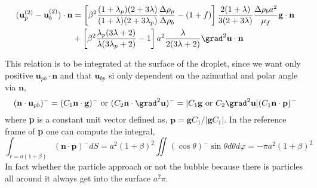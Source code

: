 \begin{align}
    (\textbf{u}_p^{(2)} - \textbf{u}_b^{(2)})\cdot \textbf{n}
    &=
    \left[\beta^2\frac{(1+\lambda_p)(2+3\lambda)}{(1+\lambda)(2+3\lambda_p)}\frac{\Delta\rho_p}{\Delta\rho_b}  - (1 + f)  \right]  \frac{2(1+\lambda)}{3(2+3\lambda)} \frac{\Delta\rho_b a^2}{\mu_f}\textbf{g}\cdot \textbf{n}\\
    &+ \left[\beta^2\frac{\lambda_p(3\lambda+2)}{\lambda(3\lambda_p +2)} - 1 \right] a^2\frac{\lambda}{2(3\lambda +2)}\grad^2 \textbf{u}\cdot \textbf{n}
\end{align}

This relation is to be integrated at the surface of the droplet, since we want only positive $\textbf{u}_{pb}\cdot\textbf{n}$ and that $\textbf{u}_{bp}$ si only dependent on the azimuthal and polar angle via $\textbf{n}$, 
\begin{equation}
    (\textbf{n} \cdot \textbf{u}_{pb})^-
    = 
     (C_1 \textbf{n} \cdot \textbf{g})^-
    \text{ or }
    (C_2 \textbf{n} \cdot \grad^2\textbf{u})^-
    =
    |C_1 \textbf{g} \text{ or } C_2 \grad^2\textbf{u} |
    (C_1 \textbf{n} \cdot \textbf{p})^-
\end{equation}
where \textbf{p} is a constant unit vector defined as, $\textbf{p} = \textbf{g}C_1 / |\textbf{g} C_1|$. In the reference frame of \textbf{p} one can compute the integral,  
\begin{equation}
    \int_{r=a(1+\beta)} (\textbf{n} \cdot \textbf{p})^-dS
    = a^2(1+\beta)^2
    \iint (\cos \theta)^- \sin\theta d\theta d\varphi
    = - \pi a^2(1+\beta)^2
\end{equation}
In fact whether the particle approach or not the bubble because there is particles all around it always get into the surface $a^2 \pi$. 

